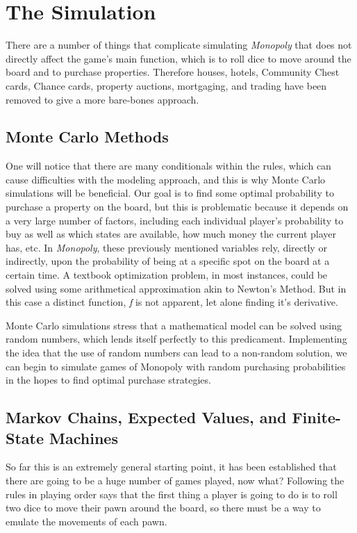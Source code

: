 \documentclass{article}
\begin{document}
\section{The Simulation}

There are a number of things that complicate simulating \textit{Monopoly} that does not directly affect the game’s main function, which is to roll dice to move around the board and to purchase properties.  Therefore houses, hotels, Community Chest cards, Chance cards, property auctions, mortgaging, and trading have been removed to give a more bare-bones approach.

\subsection{Monte Carlo Methods}

One will notice that there are many conditionals within the rules, which can cause difficulties with the modeling approach, and this is why Monte Carlo simulations will be beneficial.  Our goal is to find some optimal probability to purchase a property on the board, but this is problematic because it depends on a very large number of factors, including each individual player’s probability to buy as well as which states are available, how much money the current player has, etc.  In \textit{Monopoly}, these previously mentioned variables rely, directly or indirectly, upon the probability of being at a specific spot on the board at a certain time.  A textbook optimization problem, in most instances, could be solved using some arithmetical approximation akin to Newton's Method.  But in this case a distinct function, \textit{f} is not apparent, let alone finding it's derivative.

Monte Carlo simulations stress that a mathematical model can be solved using random numbers, which lends itself perfectly to this predicament.  Implementing the idea that the use of random numbers can lead to a non-random solution, we can begin to simulate games of Monopoly with random purchasing probabilities in the hopes to find optimal purchase strategies.

\subsection{Markov Chains, Expected Values, and Finite-State Machines}

So far this is an extremely general starting point, it has been established that there are going to be a huge number of games played, now what?  Following the rules in playing order says that the first thing a player is going to do is to roll two dice to move their pawn around the board, so there must be a way to emulate the movements of each pawn.
\end{document}
